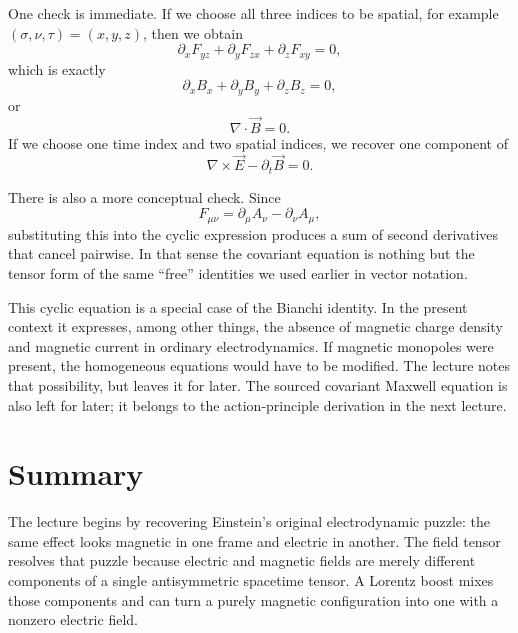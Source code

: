 One check is immediate. If we choose all three indices to be spatial, for example $(\sigma,\nu,\tau)=(x,y,z)$, then we obtain
\begin{equation}
\partial_x F_{yz}+\partial_y F_{zx}+\partial_z F_{xy}=0,
\end{equation}
which is exactly
\begin{equation}
\partial_x B_x+\partial_y B_y+\partial_z B_z=0,
\end{equation}
or
\begin{equation}
\nabla\cdot\vec B=0.
\end{equation}
If we choose one time index and two spatial indices, we recover one component of
\begin{equation}
\nabla\times\vec E-\partial_t\vec B=0.
\end{equation}

There is also a more conceptual check. Since
\begin{equation}
F_{\mu\nu}=\partial_\mu A_\nu-\partial_\nu A_\mu,
\end{equation}
substituting this into the cyclic expression produces a sum of second derivatives that cancel pairwise. In that sense the covariant equation is nothing but the tensor form of the same ``free'' identities we used earlier in vector notation.

This cyclic equation is a special case of the Bianchi identity. In the present context it expresses, among other things, the absence of magnetic charge density and magnetic current in ordinary electrodynamics. If magnetic monopoles were present, the homogeneous equations would have to be modified. The lecture notes that possibility, but leaves it for later. The sourced covariant Maxwell equation is also left for later; it belongs to the action-principle derivation in the next lecture.

\section{Summary}

The lecture begins by recovering Einstein's original electrodynamic puzzle: the same effect looks magnetic in one frame and electric in another. The field tensor resolves that puzzle because electric and magnetic fields are merely different components of a single antisymmetric spacetime tensor. A Lorentz boost mixes those components and can turn a purely magnetic configuration into one with a nonzero electric field.

